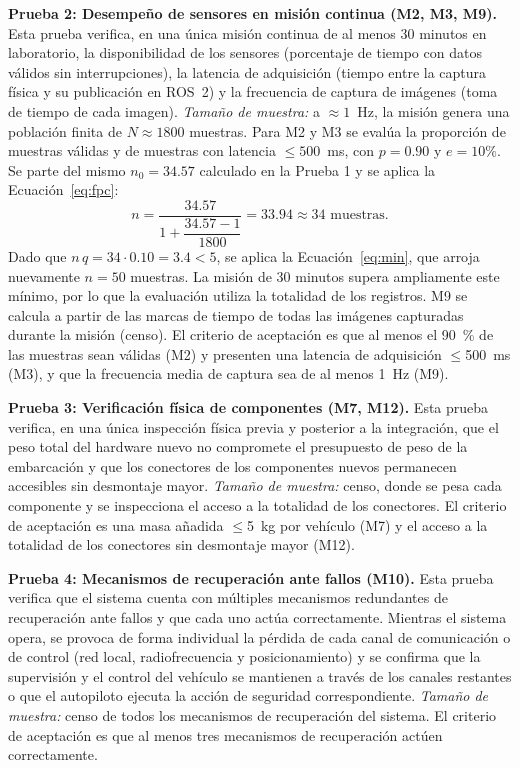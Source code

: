 \textbf{Prueba 2: Desempeño de sensores en misión continua (M2, M3, M9).} Esta prueba
verifica, en una única misión continua de al menos 30 minutos en laboratorio, la
disponibilidad de los sensores (porcentaje de tiempo con datos válidos sin interrupciones), la
latencia de adquisición (tiempo entre la captura física y su publicación en ROS~2) y
la frecuencia de captura de imágenes (toma de tiempo de cada imagen).
\emph{Tamaño de muestra:} a $\approx 1$~Hz, la misión genera una población finita de
$N \approx 1800$ muestras. Para M2 y M3 se evalúa la proporción de muestras válidas y de
muestras con latencia $\leq 500$~ms, con $p = 0.90$ y $e = 10\%$. Se parte del mismo
$n_0 = 34.57$ calculado en la Prueba 1 y se aplica la Ecuación~\eqref{eq:fpc}:
\begin{equation*}
  n = \frac{34.57}{1 + \dfrac{34.57 - 1}{1800}} = 33.94 \approx 34 \text{ muestras.}
\end{equation*}
Dado que $n\,q = 34 \cdot 0.10 = 3.4 < 5$, se aplica la Ecuación~\eqref{eq:min}, que arroja
nuevamente $n = 50$ muestras. La misión de 30 minutos supera ampliamente este mínimo, por lo
que la evaluación utiliza la totalidad de los registros. M9 se calcula a partir de las marcas
de tiempo de todas las imágenes capturadas durante la misión (censo). El criterio de aceptación 
es que al menos el 90~\% de las muestras sean válidas (M2) y presenten una latencia de adquisición 
$\leq$500~ms (M3), y que la frecuencia media de captura sea de al menos 1~Hz (M9).

\textbf{Prueba 3: Verificación física de componentes (M7, M12).} Esta prueba verifica, en
una única inspección física previa y posterior a la integración, que el peso total del
hardware nuevo no compromete el presupuesto de peso de la embarcación y que los conectores
de los componentes nuevos permanecen accesibles sin desmontaje mayor.
\emph{Tamaño de muestra:} censo, donde se pesa cada componente y se inspecciona el acceso a la
totalidad de los conectores. El criterio de aceptación es una masa añadida $\leq$5~kg por vehículo (M7) 
y el acceso a la totalidad de los conectores sin desmontaje mayor (M12).

\textbf{Prueba 4: Mecanismos de recuperación ante fallos (M10).} Esta prueba verifica que el sistema 
cuenta con múltiples mecanismos redundantes de recuperación ante fallos y que cada uno actúa correctamente. 
Mientras el sistema opera, se provoca de forma individual la pérdida de cada canal de comunicación o de control 
(red local, radiofrecuencia y posicionamiento) y se confirma que la supervisión y el control del vehículo se mantienen 
a través de los canales restantes o que el autopiloto ejecuta la acción de seguridad correspondiente. 
\textit{Tamaño de muestra:} censo de todos los mecanismos de recuperación del sistema. El criterio de aceptación 
es que al menos tres mecanismos de recuperación actúen correctamente.

